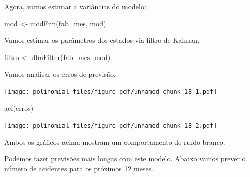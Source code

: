 \documentclass[
  letterpaper,
  DIV=11,
  numbers=noendperiod]{scrreprt}
\newenvironment{Shaded}{\begin{snugshade}}{\end{snugshade}}
\newcommand{\DecValTok}[1]{\textcolor[rgb]{0.68,0.00,0.00}{#1}}
\newcommand{\FunctionTok}[1]{\textcolor[rgb]{0.28,0.35,0.67}{#1}}
\newcommand{\NormalTok}[1]{\textcolor[rgb]{0.00,0.23,0.31}{#1}}
\newcommand{\OtherTok}[1]{\textcolor[rgb]{0.00,0.23,0.31}{#1}}
\newcommand{\SpecialCharTok}[1]{\textcolor[rgb]{0.37,0.37,0.37}{#1}}
\begin{document}
\begin{Shaded}
\end{Shaded}

Agora, vamos estimar a variâncias do modelo:

\begin{Shaded}
\begin{Highlighting}[]
\NormalTok{mod }\OtherTok{\textless{}{-}} \FunctionTok{modFim}\NormalTok{(fab\_mes, mod)}
\end{Highlighting}
\end{Shaded}

Vamos estimar os parâmetros dos estados via filtro de Kalman.

\begin{Shaded}
\begin{Highlighting}[]
\NormalTok{filtro }\OtherTok{\textless{}{-}} \FunctionTok{dlmFilter}\NormalTok{(fab\_mes, mod)}
\end{Highlighting}
\end{Shaded}

Vamos analisar os erros de previsão.

\begin{Shaded}
\end{Shaded}

\texttt{[image: polinomial\_files/figure-pdf/unnamed-chunk-18-1.pdf]}

\begin{Shaded}
\begin{Highlighting}[]
\FunctionTok{acf}\NormalTok{(erros)}
\end{Highlighting}
\end{Shaded}

\texttt{[image: polinomial\_files/figure-pdf/unnamed-chunk-18-2.pdf]}

Ambos os gráficos acima mostram um comportamento de ruído branco.

Podemos fazer previsões mais longas com este modelo. Abaixo vamos prever
o número de acidentes para os próximos 12 meses.
\end{document}
